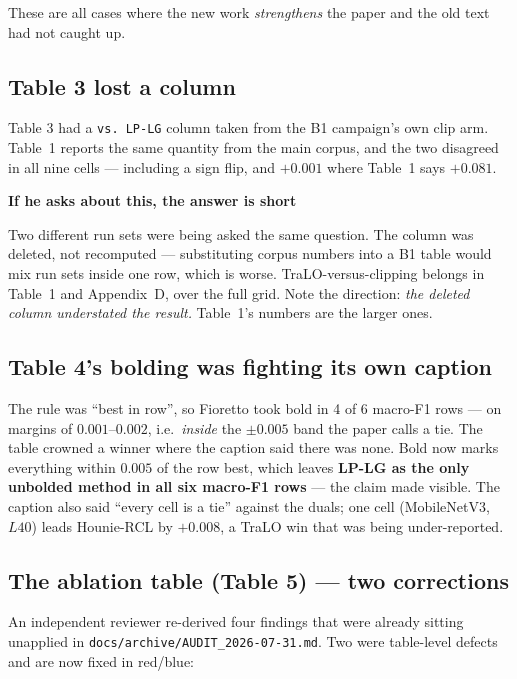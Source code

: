 \documentclass[11pt,a4paper]{article}
\newenvironment{callout}[1]
  {\par\medskip\noindent\begin{lrbox}{\calloutbox}%
   \begin{minipage}{\dimexpr\linewidth-20pt\relax}%
   \textbf{#1}\par\smallskip}
  {\end{minipage}\end{lrbox}%
   \setlength{\fboxsep}{10pt}%
   \colorbox{boxgrey}{\usebox{\calloutbox}}\par\medskip}
\begin{document}
\noindent These are all cases where the new work \emph{strengthens} the paper and the old
text had not caught up.

\subsection{Table 3 lost a column}
Table 3 had a \texttt{vs.\ LP-LG} column taken from the B1 campaign's own clip arm. Table~1
reports the same quantity from the main corpus, and the two disagreed in all nine cells ---
including a sign flip, and $+0.001$ where Table~1 says $+0.081$.

\begin{callout}{If he asks about this, the answer is short}
Two different run sets were being asked the same question. The column was deleted, not
recomputed --- substituting corpus numbers into a B1 table would mix run sets inside one
row, which is worse. TraLO-versus-clipping belongs in Table~1 and Appendix~D, over the
full grid. Note the direction: \emph{the deleted column understated the result.} Table~1's
numbers are the larger ones.
\end{callout}

\subsection{Table 4's bolding was fighting its own caption}
The rule was ``best in row'', so Fioretto took bold in 4 of 6 macro-F1 rows --- on margins
of $0.001$--$0.002$, i.e.\ \emph{inside} the $\pm0.005$ band the paper calls a tie. The
table crowned a winner where the caption said there was none. Bold now marks everything
within $0.005$ of the row best, which leaves \textbf{LP-LG as the only unbolded method in
all six macro-F1 rows} --- the claim made visible. The caption also said ``every cell is a
tie'' against the duals; one cell (MobileNetV3, $L40$) leads Hounie-RCL by $+0.008$, a
TraLO win that was being under-reported.

\subsection{The ablation table (Table 5) --- two corrections}
An independent reviewer re-derived four findings that were already sitting unapplied in
\texttt{docs/archive/AUDIT\_2026-07-31.md}. Two were table-level defects and are now fixed
in red/blue:
\end{document}
